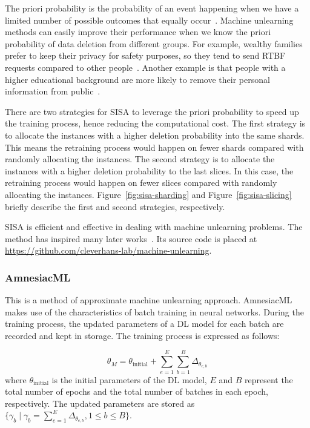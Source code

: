 The priori probability is the probability of an event happening when we have a limited number of possible outcomes that equally occur~\cite{leung2007naive}. Machine unlearning methods can easily improve their performance when we know the priori probability of data deletion from different groups. For example, wealthy families prefer to keep their privacy for safety purposes, so they tend to send RTBF requests compared to other people~\cite{upton2001strategic}. Another example is that people with a higher educational background are more likely to remove their personal information from public~\cite{eurobarometer}.

There are two strategies for SISA to leverage the priori probability to speed up the training process, hence reducing the computational cost. The first strategy is to allocate the instances with a higher deletion probability into the same shards. This means the retraining process would happen on fewer shards compared with randomly allocating the instances. The second strategy is to allocate the instances with a higher deletion probability to the last slices. In this case, the retraining process would happen on fewer slices compared with randomly allocating the instances. Figure~\ref{fig:sisa-sharding} and Figure~\ref{fig:sisa-slicing} briefly describe the first and second strategies, respectively.


SISA is efficient and effective in dealing with machine unlearning problems. The method has inspired many later works~\cite{recommendation, coded, graph-eraser}. Its source code is placed at \url{https://github.com/cleverhans-lab/machine-unlearning}.


\subsubsection{AmnesiacML~\cite{amnesiac}} This is a method of approximate machine unlearning approach. AmnesiacML makes use of the characteristics of batch training in neural networks. During the training process, the updated parameters of a DL model for each batch are recorded and kept in storage. The training process is expressed as follows:

\begin{equation}
\theta_{M} = \theta_{\mathrm{initial}} + \sum_{e=1}^{E}\sum_{b=1}^{B}\Delta_{\theta_{e,b}}
\label{amnesiac-formula}
\end{equation}
where $\theta_{\mathrm{initial}}$ is the initial parameters of the DL model, $E$ and $B$ represent the total number of epochs and the total number of batches in each epoch, respectively. The updated parameters are stored as $\{ \gamma_b \mid \gamma_b = \sum_{e=1}^E\Delta_{\theta_{e,b}} , 1 \leq b \leq B\}$.


